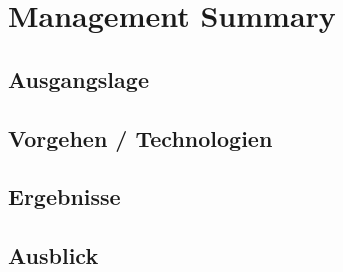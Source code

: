 \section*{Management Summary}

\subsection*{Ausgangslage}
\subsection*{Vorgehen / Technologien}
\subsection*{Ergebnisse}
\subsection*{Ausblick}
